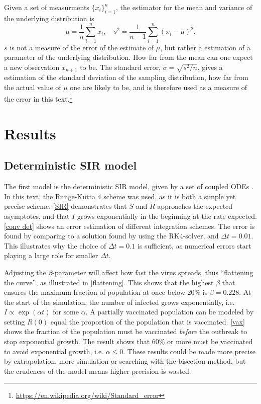 \documentclass{article}
\begin{document}
    Given a set of measurments $\{x_i\}_{i=1}^n$, the estimator for the mean and variance of the underlying distribution is 
    \begin{equation*}
        \mu = \frac{1}{n}\sum_{i=1}^n x_i, \quad s^2 = \frac{1}{n-1} \sum_{i=1}^n (x_i - \mu)^2.
    \end{equation*}
    $s$ is not a measure of the error of the estimate of $\mu$, but rather a estimation of a parameter of the underlying distribution.
    How far from the mean can one expect a new observation $x_{n+1}$ to be.
    The standard error, $\sigma = \sqrt{s^2/n}$, gives a estimation of the standard deviation of the sampling distribution, how far from the actual value of $\mu$ one are likely to be, and is therefore used as a measure of the error in this text.\footnote{\url{https://en.wikipedia.org/wiki/Standard_error}} 
    \section*{Results}
    \subsection*{Deterministic SIR model}
    The first model is the deterministic SIR model, given by a set of coupled ODEs \cite{exam}. 
    In this text, the Runge-Kutta 4 scheme was used, as it is both a simple yet precise scheme.
    \autoref{SIR} demonstrates that $S$ and $R$ approaches the expected asymptotes, and that $I$ grows exponentially in the beginning at the rate expected.
    \autoref{conv det} shows an error estimation of different integration schemes.
    The error is found by comparing to a solution found by using the RK4-solver, and $\Delta t = 0.01$.
    This illustrates why the choice of $\Delta t = 0.1$ is sufficient, as numerical errors start playing a large role for smaller $\Delta t$.
    
    Adjusting the $\beta$-parameter will affect how fast the virus spreads, thus ``flattening the curve'', as illustrated in \autoref{flattening}.
    This shows that the highest $\beta$ that ensures the maximum fraction of population   at once below $20\%$ is $\beta=0.228$. 
    At the start of the simulation, the number of infected grows exponentially, i.e. $I \propto \exp(\alpha t)$ for some $\alpha$.
    A partially vaccinated population can be modeled by setting $R(0)$ equal the proportion of the population that is vaccinated.
    \autoref{vax} shows the fraction of the population must be vaccinated \emph{before} the outbreak to stop exponential growth. 
    The result shows that $60\%$ or more must be vaccinated to avoid exponential growth, i.e. $\alpha\leq 0$. 
    These results could be made more precise by extrapolation, more simulation or searching with the bisection method, but the crudeness of the model means higher precision is wasted.
\end{document}
